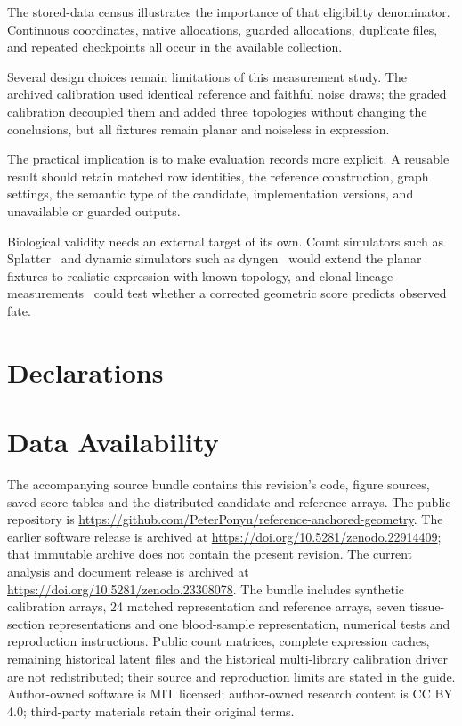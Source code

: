 \documentclass[11pt]{article}
\begin{document}
The stored-data census illustrates the importance of that eligibility denominator. Continuous coordinates, native allocations, guarded allocations, duplicate files, and repeated checkpoints all occur in the available collection.

Several design choices remain limitations of this measurement study. The archived calibration used identical reference and faithful noise draws; the graded calibration decoupled them and added three topologies without changing the conclusions, but all fixtures remain planar and noiseless in expression.

The practical implication is to make evaluation records more explicit. A reusable result should retain matched row identities, the reference construction, graph settings, the semantic type of the candidate, implementation versions, and unavailable or guarded outputs.

Biological validity needs an external target of its own. Count simulators such as Splatter~\cite{zappia2017splatter} and dynamic simulators such as dyngen~\cite{cannoodt2021dyngen} would extend the planar fixtures to realistic expression with known topology, and clonal lineage measurements~\cite{weinreb2020lineage} could test whether a corrected geometric score predicts observed fate.

\section{Declarations}

\section*{Data Availability}
The accompanying source bundle contains this revision's code, figure sources, saved score tables and the distributed candidate and reference arrays. The public repository is \url{https://github.com/PeterPonyu/reference-anchored-geometry}. The earlier software release is archived at \url{https://doi.org/10.5281/zenodo.22914409}; that immutable archive does not contain the present revision. The current analysis and document release is archived at \url{https://doi.org/10.5281/zenodo.23308078}. The bundle includes synthetic calibration arrays, 24 matched representation and reference arrays, seven tissue-section representations and one blood-sample representation, numerical tests and reproduction instructions. Public count matrices, complete expression caches, remaining historical latent files and the historical multi-library calibration driver are not redistributed; their source and reproduction limits are stated in the guide. Author-owned software is MIT licensed; author-owned research content is CC BY 4.0; third-party materials retain their original terms.
\end{document}
